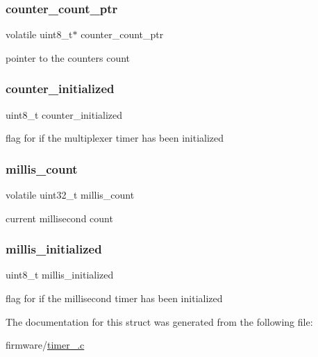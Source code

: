 \subsubsection{\texorpdfstring{counter\+\_\+count\+\_\+ptr}{counter\_count\_ptr}}
{\footnotesize\ttfamily volatile uint8\+\_\+t$\ast$ counter\+\_\+count\+\_\+ptr}



pointer to the counter\textquotesingle{}s count 

\hypertarget{structtimer__status__t_a73002fe8045c77d68c87dbb60289df08}{}\label{structtimer__status__t_a73002fe8045c77d68c87dbb60289df08} 
\subsubsection{\texorpdfstring{counter\+\_\+initialized}{counter\_initialized}}
{\footnotesize\ttfamily uint8\+\_\+t counter\+\_\+initialized}



flag for if the multiplexer timer has been initialized 

\hypertarget{structtimer__status__t_af90d90b046e42ab75ab431f74b46b216}{}\label{structtimer__status__t_af90d90b046e42ab75ab431f74b46b216} 
\subsubsection{\texorpdfstring{millis\+\_\+count}{millis\_count}}
{\footnotesize\ttfamily volatile uint32\+\_\+t millis\+\_\+count}



current millisecond count 

\hypertarget{structtimer__status__t_a6d1fa9c7cc23c7a220fe2e10b21c7a36}{}\label{structtimer__status__t_a6d1fa9c7cc23c7a220fe2e10b21c7a36} 
\subsubsection{\texorpdfstring{millis\+\_\+initialized}{millis\_initialized}}
{\footnotesize\ttfamily uint8\+\_\+t millis\+\_\+initialized}



flag for if the millisecond timer has been initialized 



The documentation for this struct was generated from the following file\+:\begin{DoxyCompactItemize}
\item 
firmware/\hyperlink{timer__4313_8c}{timer\+\_.\+c}\end{DoxyCompactItemize}
